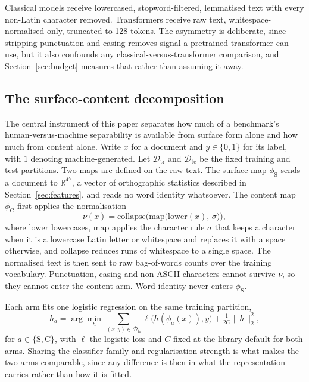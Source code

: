 Classical models receive lowercased, stopword-filtered, lemmatised text with every non-Latin character removed. Transformers receive raw text, whitespace-normalised only, truncated to 128 tokens. The asymmetry is deliberate, since stripping punctuation and casing removes signal a pretrained transformer can use, but it also confounds any classical-versus-transformer comparison, and Section~\ref{sec:budget} measures that rather than assuming it away.

\subsection{The surface-content decomposition}
\label{sec:decomp-def}

The central instrument of this paper separates how much of a benchmark's human-versus-machine separability is available from surface form alone and how much from content alone. Write $x$ for a document and $y \in \{0, 1\}$ for its label, with $1$ denoting machine-generated. Let $\mathcal{D}_{\text{tr}}$ and $\mathcal{D}_{\text{te}}$ be the fixed training and test partitions. Two maps are defined on the raw text. The surface map $\phi_{\mathrm{S}}$ sends a document to $\mathbb{R}^{47}$, a vector of orthographic statistics described in Section~\ref{sec:features}, and reads no word identity whatsoever. The content map $\phi_{\mathrm{C}}$ first applies the normalisation
\begin{equation}
\label{eq:norm}
\nu(x) = \mathrm{collapse}\Big(\mathrm{map}\big(\mathrm{lower}(x),\, \sigma\big)\Big),
\end{equation}
where $\mathrm{lower}$ lowercases, $\mathrm{map}$ applies the character rule $\sigma$ that keeps a character when it is a lowercase Latin letter or whitespace and replaces it with a space otherwise, and $\mathrm{collapse}$ reduces runs of whitespace to a single space. The normalised text is then sent to raw bag-of-words counts over the training vocabulary. Punctuation, casing and non-ASCII characters cannot survive $\nu$, so they cannot enter the content arm. Word identity never enters $\phi_{\mathrm{S}}$.

Each arm fits one logistic regression on the same training partition,
\begin{equation}
\label{eq:arm}
h_{a}  =  \arg\min_{h} \, \sum_{(x,y) \in \mathcal{D}_{\text{tr}}} \ell\big(h(\phi_{a}(x)), y\big)  +  \tfrac{1}{2C}\lVert h \rVert_2^2 ,
\end{equation}
for $a \in \{\mathrm{S}, \mathrm{C}\}$, with $\ell$ the logistic loss and $C$ fixed at the library default for both arms. Sharing the classifier family and regularisation strength is what makes the two arms comparable, since any difference is then in what the representation carries rather than how it is fitted.

